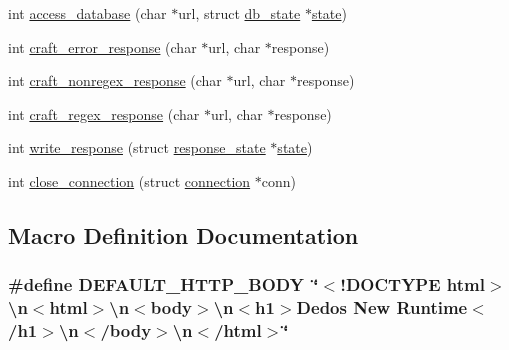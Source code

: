 \begin{DoxyCompactItemize}
\item 
int \hyperlink{connection-handler_8c_a371095605bf8a8222590bc46b2d38b59}{access\-\_\-database} (char $\ast$url, struct \hyperlink{structdb__state}{db\-\_\-state} $\ast$\hyperlink{http__parser_8c_adc6e5733fc3c22f0a7b2914188c49c90}{state})
\item 
int \hyperlink{connection-handler_8c_a8df53347c2a2137c4f39c79fbe3af03e}{craft\-\_\-error\-\_\-response} (char $\ast$url, char $\ast$response)
\item 
int \hyperlink{connection-handler_8c_a40ddee505082e691c9e94a8afda7d4b5}{craft\-\_\-nonregex\-\_\-response} (char $\ast$url, char $\ast$response)
\item 
int \hyperlink{connection-handler_8c_a7cb78a1a29fdde2658e016d01287bf7a}{craft\-\_\-regex\-\_\-response} (char $\ast$url, char $\ast$response)
\item 
int \hyperlink{connection-handler_8c_ad3d7de1563a29af15a1bbef2fc7674c9}{write\-\_\-response} (struct \hyperlink{structresponse__state}{response\-\_\-state} $\ast$\hyperlink{http__parser_8c_adc6e5733fc3c22f0a7b2914188c49c90}{state})
\item 
int \hyperlink{connection-handler_8c_a0171242e91a6a1c18938b8aba84625e5}{close\-\_\-connection} (struct \hyperlink{structconnection}{connection} $\ast$conn)
\end{DoxyCompactItemize}


\subsection{Macro Definition Documentation}
\hypertarget{connection-handler_8c_a2870bb55c6ebf7807375ec589e6a1919}{
\subsubsection[{D\-E\-F\-A\-U\-L\-T\-\_\-\-H\-T\-T\-P\-\_\-\-B\-O\-D\-Y}]{\setlength{\rightskip}{0pt plus 5cm}\#define D\-E\-F\-A\-U\-L\-T\-\_\-\-H\-T\-T\-P\-\_\-\-B\-O\-D\-Y~\char`\"{}$<$!D\-O\-C\-T\-Y\-P\-E html$>$\textbackslash{}n$<$html$>$\textbackslash{}n$<$body$>$\textbackslash{}n$<$h1$>$Dedos New Runtime$<$/h1$>$\textbackslash{}n$<$/body$>$\textbackslash{}n$<$/html$>$\char`\"{}}}\label{connection-handler_8c_a2870bb55c6ebf7807375ec589e6a1919}


